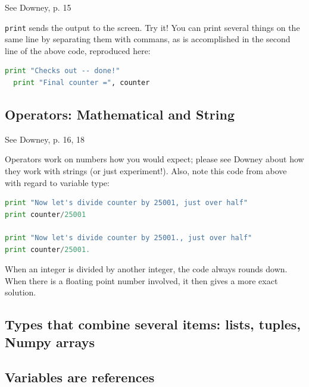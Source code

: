 \documentclass[a4paper,10pt]{scrartcl}
\begin{document}
\begin{framed}
See Downey, p. 15
\end{framed}

\lstinline{print} sends the output to the screen. Try it! You can print several things on the same line by separating them with commans, as is accomplished in the second line of the above code, reproduced here:
\begin{lstlisting}[belowskip=-1.6\baselineskip, language=python]
  print "Checks out -- done!"
  print "Final counter =", counter
\end{lstlisting}
  
\subsection{Operators: Mathematical and String}
\label{s:math}

\begin{framed}
See Downey, p. 16, 18
\end{framed}

Operators work on numbers how you would expect; please see Downey about how they work with strings (or just experiment!). Also, note this code from above with regard to variable type:
\begin{lstlisting}[belowskip=-1.6\baselineskip, language=python]
print "Now let's divide counter by 25001, just over half"
print counter/25001

print "Now let's divide counter by 25001., just over half"
print counter/25001.
\end{lstlisting}
When an integer is divided by another integer, the code always rounds down. When there is a floating point number involved, it then gives a more exact solution.

\subsection{Types that combine several items: lists, tuples, Numpy arrays}
\label{s:containerTypes}

\subsection{Variables are references}

\begin{lstlisting}
 
\end{lstlisting}
\end{document}
